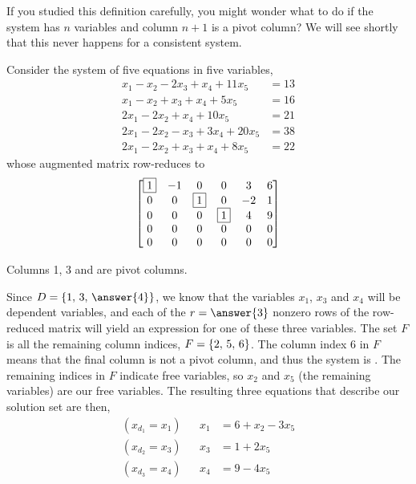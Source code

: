\documentclass{ximera}
\begin{document}
If you studied this definition carefully, you might wonder what to do if the system has $n$ variables and column $n+1$ is a pivot column?  We will see shortly that this never happens for a consistent system.

\begin{example}

Consider the system of five equations in five variables,
\begin{align*}
 x_1  - x_2  -2 x_3 +  x_4 + 11 x_5 &= 13 \\
x_1 - x_2 +  x_3+  x_4 + 5 x_5 &= 16 \\
 2 x_1  -2 x_2       +  x_4 + 10 x_5 &= 21 \\
 2 x_1  -2 x_2  - x_3 + 3 x_4 + 20 x_5 &= 38 \\
 2 x_1  -2 x_ 2 +  x_3 +  x_4 + 8 x_ 5&= 22
\end{align*}
whose augmented matrix row-reduces to
\[
\begin{bmatrix}
 \fbox{1} & -1 & 0 & 0 & 3 & 6 \\
 0 & 0 & \fbox{1} & 0 & -2 & 1 \\
 0 & 0 & 0 & \fbox{1} & 4 & 9 \\
 0 & 0 & 0 & 0 & 0 & 0 \\
 0 & 0 & 0 & 0 & 0 & 0
\end{bmatrix}
\]

Columns 1, 3 and  are pivot columns.

\begin{feedback}[correct]
  Since $D=\set{1,\,3,\,\answer{4}}$, we know that the variables
  $x_1$, $x_3$ and $x_4$ will be dependent variables, and each of the
  $r=\answer{3}$ nonzero rows of the row-reduced matrix will yield an
  expression for one of these three variables.  The set $F$ is all the
  remaining column indices, $F=\left\{2,\,5,\,6\right\}$.  The column index $6$
  in $F$ means that the final column is not a pivot column, and thus
  the system is
  .  The
  remaining indices in $F$ indicate free variables, so $x_2$ and $x_5$
  (the remaining variables) are our free variables.  The resulting
  three equations that describe our solution set are then,
  \begin{align*}
    (x_{d_1}=x_1)& & x_1&=6+x_2-3x_5\\
    (x_{d_2}=x_3)& & x_3&=1+2x_5\\
    (x_{d_3}=x_4)& & x_4&=9-4x_5
  \end{align*}
  

\end{feedback}
\end{example}
\end{document}
